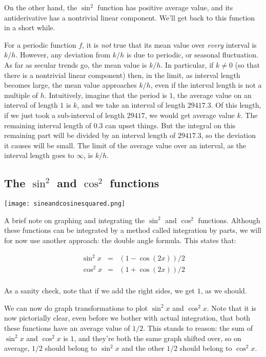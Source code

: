\documentclass{amsart}
\begin{document}
On the other hand, the $\sin^2$ function has positive average value,
and its antiderivative has a nontrivial linear component. We'll get
back to this function in a short while.

For a periodic function $f$, it is {\em not} true that its mean value
over {\em every} interval is $k/h$. However, any deviation from $k/h$
is due to periodic, or seasonal fluctuation. As far as secular trends
go, the mean value is $k/h$. In particular, if $k \ne 0$ (so that
there is a nontrivial linear component) then, in the limit, as
interval length becomes large, the mean value approaches $k/h$, even
if the interval length is not a multiple of $h$. Intuitively, imagine
that the period is $1$, the average value on an interval of length $1$
is $k$, and we take an interval of length $29417.3$. Of this length,
if we just took a sub-interval of length $29417$, we would get average
value $k$. The remaining interval length of $0.3$ can upset
things. But the integral on this remaining part will be divided by an
interval length of $29417.3$, so the deviation it causes will be
small. The limit of the average value over an interval, as the
interval length goes to $\infty$, is $k/h$.

\subsection{The $\sin^2$ and $\cos^2$ functions}

\texttt{[image: sineandcosinesquared.png]}

A brief note on graphing and integrating the $\sin^2$ and $\cos^2$
functions. Although these functions can be integrated by a method
called integration by parts, we will for now use another approach: the
double angle formula. This states that:

\begin{eqnarray*}
  \sin^2 x & = & (1 - \cos(2x))/2\\
  \cos^2 x & = & (1 + \cos(2x))/2\\
\end{eqnarray*}

As a sanity check, note that if we add the right sides, we get $1$, as
we should.

We can now do graph transformations to plot $\sin^2x$ and
$\cos^2x$. Note that it is now pictorially clear, even before we
bother with actual integration, that both these functions have an
average value of $1/2$. This stands to reason: the sum of $\sin^2x$
and $\cos^2x$ is $1$, and they're both the same graph shifted over, so
on average, $1/2$ should belong to $\sin^2x$ and the other $1/2$
should belong to $\cos^2x$.
\end{document}
